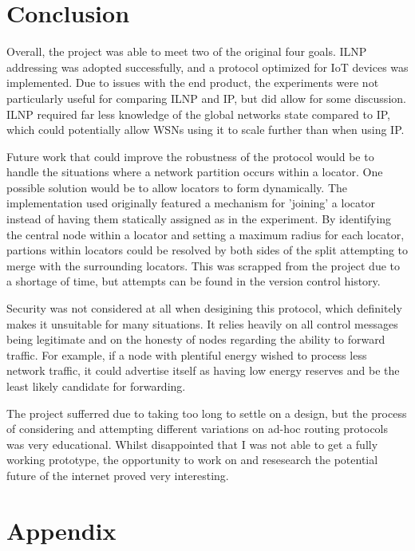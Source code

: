 \documentclass[12pt]{article}
\begin{document}
\FloatBarrier
\pagebreak
\section{Conclusion}

Overall, the project was able to meet two of the original four goals. ILNP addressing was adopted successfully, and a protocol optimized for IoT devices was implemented. Due to issues with the end product, the experiments were not particularly useful for comparing ILNP and IP, but did allow for some discussion. ILNP required far less knowledge of the global networks state compared to IP, which could potentially allow WSNs using it to scale further than when using IP. 

Future work that could improve the robustness of the protocol would be to handle the situations where a network partition occurs within a locator. One possible solution would be to allow locators to form dynamically. The implementation used originally featured a mechanism for 'joining' a locator instead of having them statically assigned as in the experiment. By identifying the central node within a locator and setting a maximum radius for each locator, partions within locators could be resolved by both sides of the split attempting to merge with the surrounding locators. This was scrapped from the project due to a shortage of time, but attempts can be found in the version control history.

Security was not considered at all when desigining this protocol, which definitely makes it unsuitable for many situations. It relies heavily on all control messages being legitimate and on the honesty of nodes regarding the ability to forward traffic. For example, if a node with plentiful energy wished to process less network traffic, it could advertise itself as having low energy reserves and be the least likely candidate for forwarding.

The project sufferred due to taking too long to settle on a design, but the process of considering and attempting different variations on ad-hoc routing protocols was very educational. Whilst disappointed that I was not able to get a fully working prototype, the opportunity to work on and resesearch the potential future of the internet proved very interesting.

\pagebreak
\section{Appendix}
\end{document}
